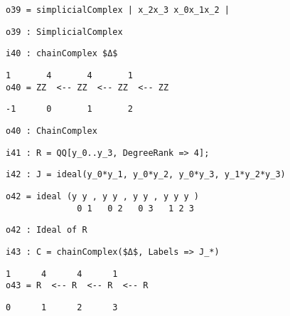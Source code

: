 \documentclass[12pt,leqno]{amsart}
\theoremstyle{definition}
\begin{document}
\begin{lstlisting}[xleftmargin=10pt, aboveskip=1.5pt, belowskip=1.5pt]
o39 = simplicialComplex | x_2x_3 x_0x_1x_2 |
\end{lstlisting}
\begin{lstlisting}[xleftmargin=10pt, aboveskip=1.5pt, belowskip=1.5pt]
o39 : SimplicialComplex
\end{lstlisting}
\begin{lstlisting}[xleftmargin=10pt, aboveskip=1.5pt, belowskip=1.5pt]
i40 : chainComplex $Δ$
\end{lstlisting}
\begin{lstlisting}[xleftmargin=10pt, lineskip=-10pt, aboveskip=1.5pt, belowskip=1.5pt]
        1       4       4       1
o40 = ZZ  <-- ZZ  <-- ZZ  <-- ZZ
\end{lstlisting}
\begin{lstlisting}[xleftmargin=10pt, aboveskip=1.5pt, belowskip=1.5pt]
      -1      0       1       2
\end{lstlisting}
\begin{lstlisting}[xleftmargin=10pt, aboveskip=1.5pt, belowskip=1.5pt]
o40 : ChainComplex
\end{lstlisting}
\begin{lstlisting}[xleftmargin=10pt, aboveskip=1.5pt, belowskip=1.5pt]
i41 : R = QQ[y_0..y_3, DegreeRank => 4];
\end{lstlisting}
\begin{lstlisting}[xleftmargin=10pt, aboveskip=1.5pt, belowskip=1.5pt]
i42 : J = ideal(y_0*y_1, y_0*y_2, y_0*y_3, y_1*y_2*y_3)
\end{lstlisting}
\begin{lstlisting}[xleftmargin=10pt, lineskip=-10pt, aboveskip=1.5pt, belowskip=1.5pt]
o42 = ideal (y y , y y , y y , y y y )
              0 1   0 2   0 3   1 2 3
\end{lstlisting}
\begin{lstlisting}[xleftmargin=10pt, aboveskip=1.5pt, belowskip=1.5pt]
o42 : Ideal of R
\end{lstlisting}
\begin{lstlisting}[xleftmargin=10pt, aboveskip=1.5pt, belowskip=1.5pt]
i43 : C = chainComplex($Δ$, Labels => J_*)
\end{lstlisting}
\begin{lstlisting}[xleftmargin=10pt, lineskip=-10pt, aboveskip=1.5pt, belowskip=1.5pt]
       1      4      4      1
o43 = R  <-- R  <-- R  <-- R
\end{lstlisting}
\begin{lstlisting}[xleftmargin=10pt, aboveskip=1.5pt, belowskip=1.5pt]                           
      0      1      2      3
\end{lstlisting}
\end{document}
